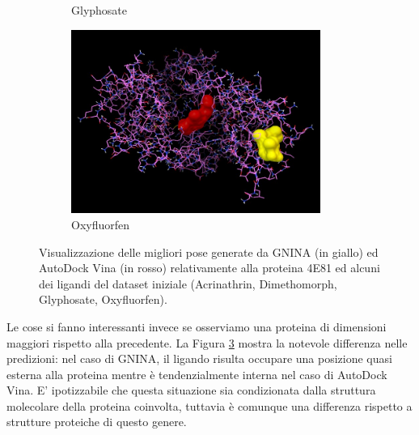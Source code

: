 \begin{figure}
\begin{subfigure}[b]{0.475\textwidth}
        \caption[]%
        {{\small Glyphosate}}    
        \label{fig:2h8v_glyphosate}
    \end{subfigure}
    \hfill
    \begin{subfigure}[b]{0.475\textwidth}   
        \centering 
        \includegraphics[width=\textwidth, height=6cm]{images/chapter4/visualization/4e81_oxyfluorfen.jpg}
        \caption[]%
        {{\small Oxyfluorfen}}    
        \label{fig:2h8v_oxyfluorfen}
    \end{subfigure}
    \caption[Conformazioni proteina-ligando per la proteina 4E81. ]
    {\small Visualizzazione delle migliori pose generate da GNINA (in giallo) ed AutoDock Vina (in rosso) relativamente alla proteina 4E81 ed alcuni dei ligandi del dataset iniziale (Acrinathrin, Dimethomorph, Glyphosate, Oxyfluorfen).} 
    \label{fig:4e81}
\end{figure}



Le cose si fanno interessanti invece se osserviamo una proteina di dimensioni maggiori rispetto alla precedente. La Figura \ref{fig:4e81} mostra la notevole differenza nelle predizioni: nel caso di GNINA, il ligando risulta occupare una posizione quasi esterna alla proteina mentre è tendenzialmente interna nel caso di AutoDock Vina. E' ipotizzabile che questa situazione sia condizionata dalla struttura molecolare della proteina coinvolta, tuttavia è comunque una differenza rispetto a strutture proteiche di questo genere.



